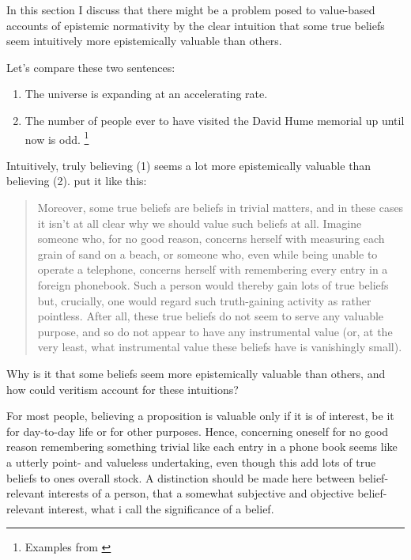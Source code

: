 \documentclass[12pt,numbers=noenddot]{scrartcl}
\begin{document}
In this section I discuss that there might be a problem posed to value-based accounts of epistemic normativity by the clear intuition that some true beliefs seem intuitively more epistemically valuable than others.

Let's compare these two sentences:
\begin{enumerate}
    \item The universe is expanding at an accelerating rate.
    \item The number of people ever to have visited the David Hume memorial up until now is odd. \footnote{Examples from \textcite{Ahlstrom-Vij2013}}
\end{enumerate}

Intuitively, truly believing (1) seems a lot more epistemically valuable than believing (2). \textcite{sep-knowledge-value} put it like this:

\begin{quote}
    Moreover, some true beliefs are beliefs in trivial matters, and in these cases it isn't at all clear why we should value such beliefs at all. Imagine someone who, for no good reason, concerns herself with measuring each grain of sand on a beach, or someone who, even while being unable to operate a telephone, concerns herself with remembering every entry in a foreign phonebook. Such a person would thereby gain lots of true beliefs but, crucially, one would regard such truth-gaining activity as rather pointless. After all, these true beliefs do not seem to serve any valuable purpose, and so do not appear to have any instrumental value (or, at the very least, what instrumental value these beliefs have is vanishingly small).
\end{quote}

Why is it that some beliefs seem more epistemically valuable than others, and how could veritism account for these intuitions?

For most people, believing a proposition is valuable only if it is of interest, be it for day-to-day life or for other purposes. Hence, concerning oneself for no good reason remembering something trivial like each entry in a phone book seems like a utterly point- and valueless undertaking, even though this add lots of true beliefs to ones overall stock. A distinction should be made here between belief-relevant interests of a person, that a somewhat subjective and objective belief-relevant interest, what i call the significance of a belief.
\end{document}
